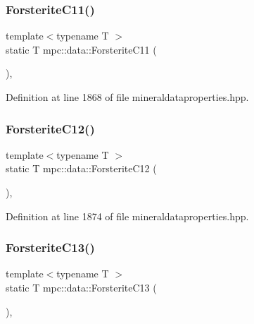 \subsubsection{\texorpdfstring{Forsterite\+C11()}{ForsteriteC11()}}
{\footnotesize\ttfamily template$<$typename T $>$ \\
static T mpc\+::data\+::\+Forsterite\+C11 (\begin{DoxyParamCaption}{ }\end{DoxyParamCaption})\hspace{0.3cm}{\ttfamily [inline]}, {\ttfamily [static]}}



Definition at line 1868 of file mineraldataproperties.\+hpp.

\mbox{\label{namespacempc_1_1data_af561e4e0c1e98b81097887ab8bfa1033}} 
\subsubsection{\texorpdfstring{Forsterite\+C12()}{ForsteriteC12()}}
{\footnotesize\ttfamily template$<$typename T $>$ \\
static T mpc\+::data\+::\+Forsterite\+C12 (\begin{DoxyParamCaption}{ }\end{DoxyParamCaption})\hspace{0.3cm}{\ttfamily [inline]}, {\ttfamily [static]}}



Definition at line 1874 of file mineraldataproperties.\+hpp.

\mbox{\label{namespacempc_1_1data_a66f3de0039cd94bfa181df2d9a8cdfac}} 
\subsubsection{\texorpdfstring{Forsterite\+C13()}{ForsteriteC13()}}
{\footnotesize\ttfamily template$<$typename T $>$ \\
static T mpc\+::data\+::\+Forsterite\+C13 (\begin{DoxyParamCaption}{ }\end{DoxyParamCaption})\hspace{0.3cm}{\ttfamily [inline]}, {\ttfamily [static]}}



